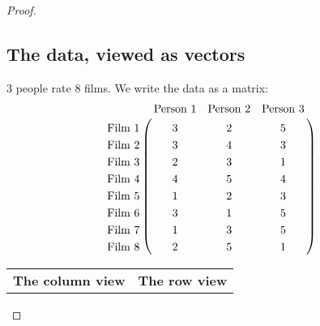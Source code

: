 \begin{proof}

\newpage
\subsection*{The data, viewed as vectors}

3 people rate 8 films. We write the data as a matrix:
\begin{align*}
\bordermatrix{
                &\text{Person 1} & \text{Person 2} &\text{Person 3} \cr
  \text{Film 1} &3               &  2              &  5             \cr
  \text{Film 2} &3               &  4              &  3             \cr
  \text{Film 3} &2               &  3              &  1             \cr
  \text{Film 4} &4               &  5              &  4             \cr
  \text{Film 5} &1               &  2              &  3             \cr
  \text{Film 6} &3               &  1              &  5             \cr
  \text{Film 7} &1               &  3              &  5             \cr
  \text{Film 8} &2               &  5              &  1             \cr
}
\end{align*}

\begin{tabular}{|p{8cm}|p{8 cm}|}
  {\bf The column view}
  &{\bf The row view}\\


\end{tabular}
\end{proof}
